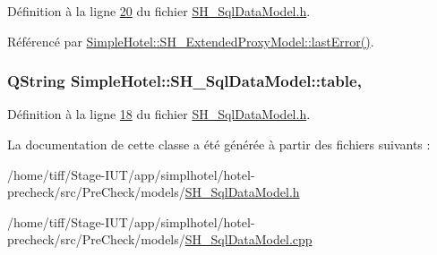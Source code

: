 Définition à la ligne \hyperlink{SH__SqlDataModel_8h_source_l00020}{20} du fichier \hyperlink{SH__SqlDataModel_8h_source}{S\-H\-\_\-\-Sql\-Data\-Model.\-h}.



Référencé par \hyperlink{classSimpleHotel_1_1SH__ExtendedProxyModel_a2fe3237fc71062037d0e68530e4c18d9}{Simple\-Hotel\-::\-S\-H\-\_\-\-Extended\-Proxy\-Model\-::last\-Error()}.

\hypertarget{classSimpleHotel_1_1SH__SqlDataModel_a79f69cfc95a9f02277a148d7511e1f82}{
\subsubsection[{table}]{\setlength{\rightskip}{0pt plus 5cm}Q\-String Simple\-Hotel\-::\-S\-H\-\_\-\-Sql\-Data\-Model\-::table\hspace{0.3cm}{\ttfamily [read]}, {\ttfamily [write]}}}\label{classSimpleHotel_1_1SH__SqlDataModel_a79f69cfc95a9f02277a148d7511e1f82}


Définition à la ligne \hyperlink{SH__SqlDataModel_8h_source_l00018}{18} du fichier \hyperlink{SH__SqlDataModel_8h_source}{S\-H\-\_\-\-Sql\-Data\-Model.\-h}.



La documentation de cette classe a été générée à partir des fichiers suivants \-:\begin{DoxyCompactItemize}
\item 
/home/tiff/\-Stage-\/\-I\-U\-T/app/simplhotel/hotel-\/precheck/src/\-Pre\-Check/models/\hyperlink{SH__SqlDataModel_8h}{S\-H\-\_\-\-Sql\-Data\-Model.\-h}\item 
/home/tiff/\-Stage-\/\-I\-U\-T/app/simplhotel/hotel-\/precheck/src/\-Pre\-Check/models/\hyperlink{SH__SqlDataModel_8cpp}{S\-H\-\_\-\-Sql\-Data\-Model.\-cpp}\end{DoxyCompactItemize}
